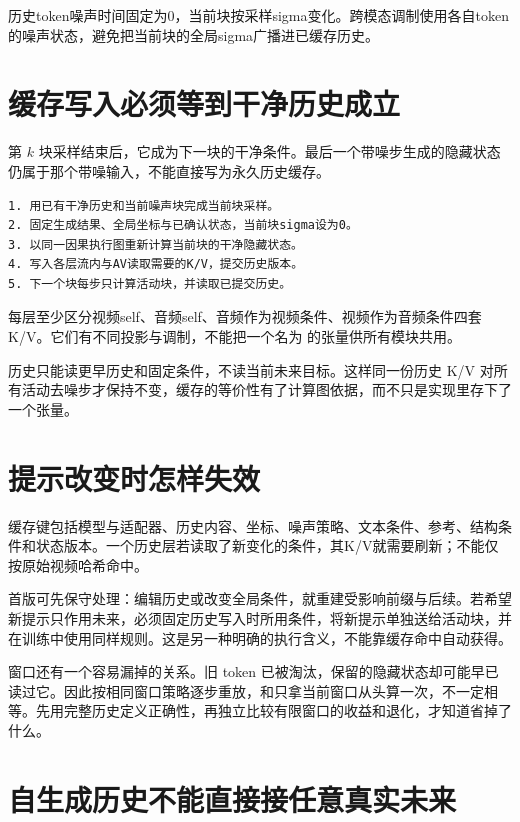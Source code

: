 历史token噪声时间固定为0，当前块按采样sigma变化。跨模态调制使用各自token的噪声状态，避免把当前块的全局sigma广播进已缓存历史。

\section{缓存写入必须等到干净历史成立}\label{seedance-m24-ux7f13ux5b58ux5199ux5165ux5fc5ux987bux7b49ux5230ux5e72ux51c0ux5386ux53f2ux6210ux7acb}

第 \(k\) 块采样结束后，它成为下一块的干净条件。最后一个带噪步生成的隐藏状态仍属于那个带噪输入，不能直接写为永久历史缓存。

\begin{verbatim}
1. 用已有干净历史和当前噪声块完成当前块采样。
2. 固定生成结果、全局坐标与已确认状态，当前块sigma设为0。
3. 以同一因果执行图重新计算当前块的干净隐藏状态。
4. 写入各层流内与AV读取需要的K/V，提交历史版本。
5. 下一个块每步只计算活动块，并读取已提交历史。
\end{verbatim}

每层至少区分视频self、音频self、音频作为视频条件、视频作为音频条件四套K/V。它们有不同投影与调制，不能把一个名为  的张量供所有模块共用。

历史只能读更早历史和固定条件，不读当前未来目标。这样同一份历史 K/V 对所有活动去噪步才保持不变，缓存的等价性有了计算图依据，而不只是实现里存下了一个张量。

\section{提示改变时怎样失效}\label{seedance-m24-ux63d0ux793aux6539ux53d8ux65f6ux600eux6837ux5931ux6548}

缓存键包括模型与适配器、历史内容、坐标、噪声策略、文本条件、参考、结构条件和状态版本。一个历史层若读取了新变化的条件，其K/V就需要刷新；不能仅按原始视频哈希命中。

首版可先保守处理：编辑历史或改变全局条件，就重建受影响前缀与后续。若希望新提示只作用未来，必须固定历史写入时所用条件，将新提示单独送给活动块，并在训练中使用同样规则。这是另一种明确的执行含义，不能靠缓存命中自动获得。

窗口还有一个容易漏掉的关系。旧 token 已被淘汰，保留的隐藏状态却可能早已读过它。因此按相同窗口策略逐步重放，和只拿当前窗口从头算一次，不一定相等。先用完整历史定义正确性，再独立比较有限窗口的收益和退化，才知道省掉了什么。

\section{自生成历史不能直接接任意真实未来}\label{seedance-m24-ux81eaux751fux6210ux5386ux53f2ux4e0dux80fdux76f4ux63a5ux63a5ux4efbux610fux771fux5b9eux672aux6765}

